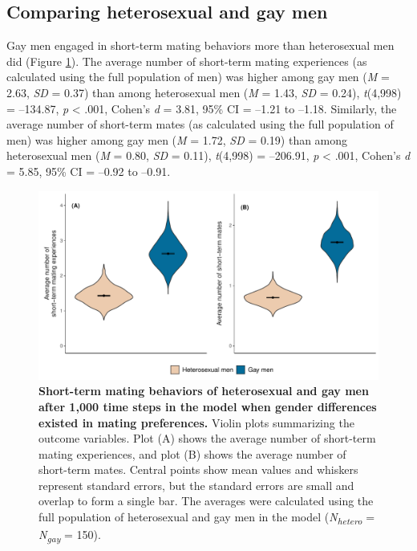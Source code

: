 \documentclass[
  11pt,
]{article}
\begin{document}
\hypertarget{comparing-heterosexual-and-gay-men}{%
\subsection{Comparing heterosexual and gay
men}\label{comparing-heterosexual-and-gay-men}}

Gay men engaged in short-term mating behaviors more than heterosexual
men did (Figure \ref{fig:hetero_vs_gay}). The average number of
short-term mating experiences (as calculated using the full population
of men) was higher among gay men (\emph{M} = 2.63, \emph{SD} = 0.37)
than among heterosexual men (\emph{M} = 1.43, \emph{SD} = 0.24),
\emph{t}(4,998) = --134.87, \emph{p} \textless{} .001, Cohen's \emph{d}
= 3.81, 95\% CI = --1.21 to --1.18. Similarly, the average number of
short-term mates (as calculated using the full population of men) was
higher among gay men (\emph{M} = 1.72, \emph{SD} = 0.19) than among
heterosexual men (\emph{M} = 0.80, \emph{SD} = 0.11), \emph{t}(4,998) =
--206.91, \emph{p} \textless{} .001, Cohen's \emph{d} = 5.85, 95\% CI =
--0.92 to --0.91.

\begin{figure}[h]
  \centering
  \includegraphics[width=0.8\columnwidth]{figures/fig3_hetero_vs_gay_men.pdf}
  \caption{\textbf{Short-term mating behaviors of heterosexual and gay men after 1,000 time steps in the model when gender differences existed in mating preferences.} Violin plots summarizing the outcome variables. Plot (A) shows the average number of short-term mating experiences, and plot (B) shows the average number of short-term mates. Central points show mean values and whiskers represent standard errors, but the standard errors are small and overlap to form a single bar. The averages were calculated using the full population of heterosexual and gay men in the model (\textit{N\textsubscript{hetero}} = \textit{N\textsubscript{gay}} = 150).}
  \label{fig:hetero_vs_gay}
\end{figure}
\end{document}
